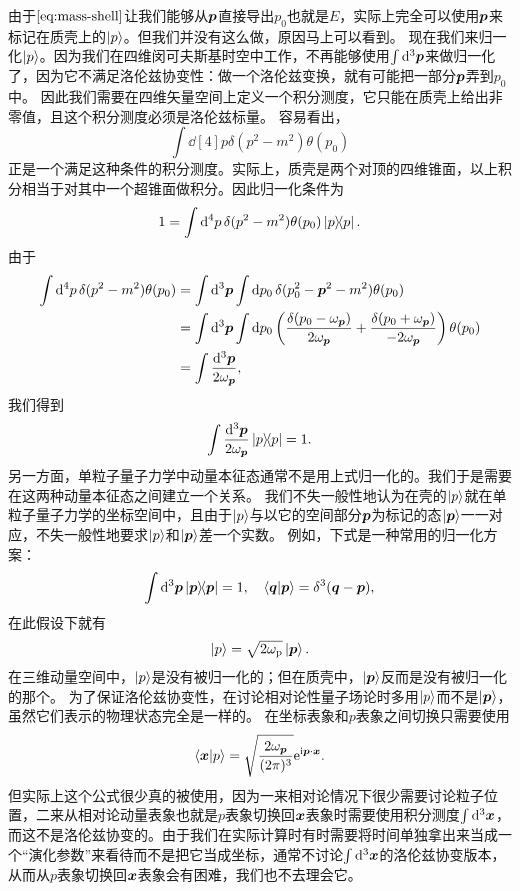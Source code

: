 由于$\eqref{eq:mass-shell}$让我们能够从$\vb*{p}$直接导出$p_0$也就是$E$，实际上完全可以使用$\vb*{p}$来标记在质壳上的$\ket{p}$。但我们并没有这么做，原因马上可以看到。
现在我们来归一化$\ket{p}$。因为我们在四维闵可夫斯基时空中工作，不再能够使用$\int \dd[3]{\vb*{p}}$来做归一化了，因为它不满足洛伦兹协变性：做一个洛伦兹变换，就有可能把一部分$\vb*{p}$弄到$p_0$中。
因此我们需要在四维矢量空间上定义一个积分测度，它只能在质壳上给出非零值，且这个积分测度必须是洛伦兹标量。
容易看出，
\[
    \int \dd[4]{p} \delta(p^2 - m^2) \theta(p_0)
\]
正是一个满足这种条件的积分测度。实际上，质壳是两个对顶的四维锥面，以上积分相当于对其中一个超锥面做积分。因此归一化条件为
\[
    1 = \int \dd[4]{p} \delta(p^2 - m^2) \theta(p_0) \dyad{p}.
\]
由于
\[
    \begin{aligned}
        \int \dd[4]{p} \delta(p^2 - m^2) \theta(p_0) &= \int \dd[3]{\vb*{p}} \int \dd{p_0} \delta (p_0^2 - \vb*{p}^2 - m^2) \theta(p_0) \\
        &= \int \dd[3]{\vb*{p}} \int \dd{p_0} \left( \frac{\delta(p_0 - \omega_{\vb*{p}})}{2 \omega_{\vb*{p}}} + \frac{\delta(p_0 + \omega_{\vb*{p}})}{- 2 \omega_{\vb*{p}}} \right) \theta (p_0) \\
        &= \int \frac{\dd[3]{\vb*{p}}}{2 \omega_{\vb*{p}}},
    \end{aligned}
\]
我们得到
\[
    \int \frac{\dd[3]{\vb*{p}}}{2\omega_{\vb*{p}}} \dyad{p} = 1.
\]
另一方面，单粒子量子力学中动量本征态通常不是用上式归一化的。我们于是需要在这两种动量本征态之间建立一个关系。
我们不失一般性地认为在壳的$\ket{p}$就在单粒子量子力学的坐标空间中，且由于$\ket{p}$与以它的空间部分$\vb*{p}$为标记的态$\ket{\vb*{p}}$一一对应，不失一般性地要求$\ket{p}$和$\ket{\vb*{p}}$差一个实数。
例如，下式是一种常用的归一化方案：
\[
    \int \dd[3]{\vb*{p}} \dyad{\vb*{p}} = 1, \quad \braket{\vb*{q}}{\vb*{p}} = \delta^3(\vb*{q} - \vb*{p}),
\]
在此假设下就有
\begin{equation}
    \ket{p} = \sqrt{2 \omega_{\text{p}}} \ket{\vb*{p}}.
\end{equation}
在三维动量空间中，$\ket{p}$是没有被归一化的；但在质壳中，$\ket{\vb*{p}}$反而是没有被归一化的那个。
为了保证洛伦兹协变性，在讨论相对论性量子场论时多用$\ket{p}$而不是$\ket{\vb*{p}}$，虽然它们表示的物理状态完全是一样的。
在坐标表象和$p$表象之间切换只需要使用
\begin{equation}
    \braket{\vb*{x}}{p} = \sqrt{\frac{2 \omega_{\vb*{p}}}{(2\pi)^3}} \mathrm{e}^{\mathrm{i} \vb*{p} \cdot \vb*{x}}.
    \label{eq:relativity-x-p-trans}
\end{equation}
但实际上这个公式很少真的被使用，因为一来相对论情况下很少需要讨论粒子位置，二来从相对论动量表象也就是$p$表象切换回$\vb*{x}$表象时需要使用积分测度$\int \dd[3]{\vb*{x}}$，而这不是洛伦兹协变的。由于我们在实际计算时有时需要将时间单独拿出来当成一个“演化参数”来看待而不是把它当成坐标，通常不讨论$\int \dd[3]{\vb*{x}}$的洛伦兹协变版本，从而从$p$表象切换回$\vb*{x}$表象会有困难，我们也不去理会它。

